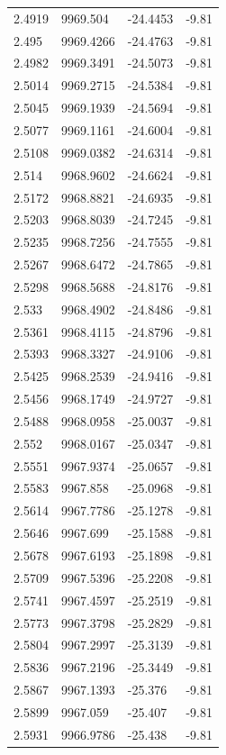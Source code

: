 \begin{table}[H]
\begin{tabular}{llll}
2.4919 & 9969.504 & -24.4453 & -9.81 \\
2.495 & 9969.4266 & -24.4763 & -9.81 \\
2.4982 & 9969.3491 & -24.5073 & -9.81 \\
2.5014 & 9969.2715 & -24.5384 & -9.81 \\
2.5045 & 9969.1939 & -24.5694 & -9.81 \\
2.5077 & 9969.1161 & -24.6004 & -9.81 \\
2.5108 & 9969.0382 & -24.6314 & -9.81 \\
2.514 & 9968.9602 & -24.6624 & -9.81 \\
2.5172 & 9968.8821 & -24.6935 & -9.81 \\
2.5203 & 9968.8039 & -24.7245 & -9.81 \\
2.5235 & 9968.7256 & -24.7555 & -9.81 \\
2.5267 & 9968.6472 & -24.7865 & -9.81 \\
2.5298 & 9968.5688 & -24.8176 & -9.81 \\
2.533 & 9968.4902 & -24.8486 & -9.81 \\
2.5361 & 9968.4115 & -24.8796 & -9.81 \\
2.5393 & 9968.3327 & -24.9106 & -9.81 \\
2.5425 & 9968.2539 & -24.9416 & -9.81 \\
2.5456 & 9968.1749 & -24.9727 & -9.81 \\
2.5488 & 9968.0958 & -25.0037 & -9.81 \\
2.552 & 9968.0167 & -25.0347 & -9.81 \\
2.5551 & 9967.9374 & -25.0657 & -9.81 \\
2.5583 & 9967.858 & -25.0968 & -9.81 \\
2.5614 & 9967.7786 & -25.1278 & -9.81 \\
2.5646 & 9967.699 & -25.1588 & -9.81 \\
2.5678 & 9967.6193 & -25.1898 & -9.81 \\
2.5709 & 9967.5396 & -25.2208 & -9.81 \\
2.5741 & 9967.4597 & -25.2519 & -9.81 \\
2.5773 & 9967.3798 & -25.2829 & -9.81 \\
2.5804 & 9967.2997 & -25.3139 & -9.81 \\
2.5836 & 9967.2196 & -25.3449 & -9.81 \\
2.5867 & 9967.1393 & -25.376 & -9.81 \\
2.5899 & 9967.059 & -25.407 & -9.81 \\
2.5931 & 9966.9786 & -25.438 & -9.81 \\

\end{tabular}
\end{table}
